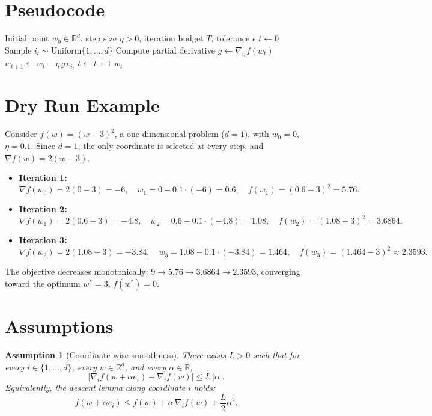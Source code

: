 \documentclass{article}
\newtheorem{assumption}{Assumption}
\begin{document}
\section*{Pseudocode}

\begin{algorithm}[H]
\caption{Randomized Coordinate Gradient Descent (RCGD)}
\begin{algorithmic}[1]
\Require Initial point $w_0 \in \mathbb{R}^d$, step size $\eta > 0$, iteration budget $T$, tolerance $\epsilon$
\State $t \gets 0$
    \State Sample $i_t \sim \mathrm{Uniform}\{1,\dots,d\}$
    \State Compute partial derivative $g \gets \nabla_{i_t} f(w_t)$
    \State $w_{t+1} \gets w_t - \eta\, g\, e_{i_t}$ 
    \State $t \gets t + 1$
\EndWhile
\State \Return $w_t$
\end{algorithmic}
\end{algorithm}

\section*{Dry Run Example}

Consider $f(w) = (w-3)^2$, a one-dimensional problem ($d=1$), with
$w_0 = 0$, $\eta = 0.1$. Since $d=1$, the only coordinate is selected at every
step, and $\nabla f(w) = 2(w-3)$.

\begin{itemize}
\item \textbf{Iteration 1:}
\[
\nabla f(w_0) = 2(0-3) = -6, \quad
w_1 = 0 - 0.1\cdot(-6) = 0.6, \quad
f(w_1) = (0.6-3)^2 = 5.76.
\]
\item \textbf{Iteration 2:}
\[
\nabla f(w_1) = 2(0.6-3) = -4.8, \quad
w_2 = 0.6 - 0.1\cdot(-4.8) = 1.08, \quad
f(w_2) = (1.08-3)^2 = 3.6864.
\]
\item \textbf{Iteration 3:}
\[
\nabla f(w_2) = 2(1.08-3) = -3.84, \quad
w_3 = 1.08 - 0.1\cdot(-3.84) = 1.464, \quad
f(w_3) = (1.464-3)^2 \approx 2.3593.
\]
\end{itemize}

The objective decreases monotonically: $9 \to 5.76 \to 3.6864 \to 2.3593$,
converging toward the optimum $w^* = 3$, $f(w^*)=0$.

\section*{Assumptions}

\begin{assumption}[Coordinate-wise smoothness]
\label{ass:smooth}
There exists $L > 0$ such that for every $i \in \{1,\dots,d\}$, every $w \in \mathbb{R}^d$,
and every $\alpha \in \mathbb{R}$,
\[
\left| \nabla_i f(w + \alpha e_i) - \nabla_i f(w) \right| \le L\, |\alpha|.
\]
Equivalently, the descent lemma along coordinate $i$ holds:
\[
f(w + \alpha e_i) \le f(w) + \alpha\, \nabla_i f(w) + \frac{L}{2}\alpha^2 .
\]
\end{assumption}
\end{document}

